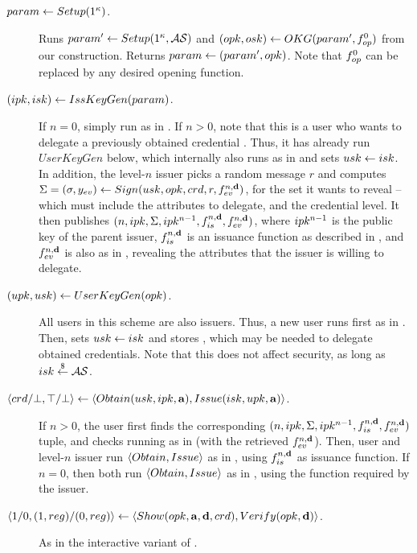\begin{description}
\item[$param \gets Setup(1^\kappa)$.]  Runs $param' \gets Setup(1^\kappa,
  \mathcal{AS})$ and $(opk,osk) \gets OKG(param',f_{op}^0)$ from our
  \CUASGen construction. Returns $param \gets (param',opk)$. Note that
  $f_{op}^0$ can be replaced by any desired opening function.
\item[$(ipk,isk) \gets IssKeyGen(param)$.] If $n=0$, simply run \IKeyGen as
  in \CUASAC. If $n>0$, note that this is a user who wants to delegate a
  previously obtained credential \cred. Thus, it has already run $UserKeyGen$
  below, which internally also runs \IKeyGen as in \CUASGen and sets $usk \gets
  isk$. In addition, the level-$n$ issuer picks a random message $r$ and
  computes $\Sigma = (\sigma,y_{ev}) \gets Sign(usk,opk,crd,r,
  f_{ev}^{n,\mathbf{d}})$, for the \dattrs set it wants to reveal -- which must
  include the attributes to delegate, and the credential level. It then
  publishes $(n,ipk,\Sigma,ipk^{n-1},f_{is}^{n,\mathbf{d}},f_{ev}^{n,\mathbf{d}})$,
  where $ipk^{n-1}$ is the public key of the parent issuer,
  $f_{is}^{n,\mathbf{d}}$ is an issuance function as described in
  , and $f_{ev}^{n,\mathbf{d}}$ is also as in
  , revealing the attributes that the issuer is
  willing to delegate.
\item[$(upk,usk) \gets UserKeyGen(opk)$.] All users in this scheme are
  also issuers. Thus, a new user runs first \IKeyGen as in \CUASGen. Then, sets
  $usk \gets isk$ and stores \ipk, which may be needed to delegate obtained
  credentials. Note that this does not affect security, as long as
  $isk \stackrel{\$}{\gets} \mathcal{AS}$.
\item[$\langle crd/\bot,\top/\bot \rangle \gets
  \langle Obtain(usk,ipk,\mathbf{a}),Issue(isk,upk,\mathbf{a}) \rangle$.]
  If $n>0$, the user first finds the corresponding $(n,ipk,\Sigma,ipk^{n-1},
  f_{is}^{n,\mathbf{d}},f_{ev}^{n,\mathbf{d}})$ tuple, and checks \Sig running
  \Verify as in \CUASGen (with the retrieved $f_{ev}^{n,\mathbf{d}}$). Then,
  user and level-$n$ issuer run $\langle Obtain,Issue\rangle$ as in \CUASGen,
  using $f_{is}^{n,\mathbf{d}}$ as issuance function. If $n=0$, then both run
  $\langle Obtain,Issue\rangle$ as in \CUASGen, using the \fissue function
  required by the issuer.
\item[$\langle 1/0,(1,reg)/(0,reg)\rangle
  \gets \langle Show(opk,\mathbf{a},\mathbf{d},crd),
  Verify(opk,\mathbf{d}) \rangle$.] As in the interactive variant of \CUASGen.  
\end{description}

